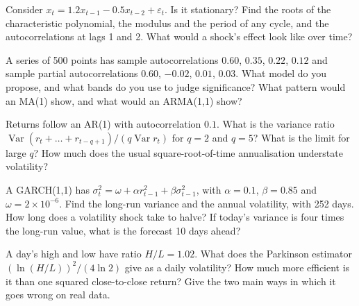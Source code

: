 \begin{question}\label{iq:iv1:time-series:5}
Consider $x_t = 1.2x_{t-1} - 0.5x_{t-2} + \varepsilon_t$. Is it stationary? Find the roots of the characteristic polynomial, the modulus and the period of any cycle, and the autocorrelations at lags 1 and 2. What would a shock's effect look like over time?
\end{question}

\begin{question}\label{iq:iv1:time-series:6}
A series of 500 points has sample autocorrelations $0.60$, $0.35$, $0.22$, $0.12$ and sample partial autocorrelations $0.60$, $-0.02$, $0.01$, $0.03$. What model do you propose, and what bands do you use to judge significance? What pattern would an MA(1) show, and what would an ARMA(1,1) show?
\end{question}

\begin{question}\label{iq:iv1:time-series:7}
Returns follow an AR(1) with autocorrelation $0.1$. What is the variance ratio $\operatorname{Var}(r_t + \dots + r_{t-q+1})/(q\operatorname{Var}r_t)$ for $q = 2$ and $q = 5$? What is the limit for large $q$? How much does the usual square-root-of-time annualisation understate volatility?
\end{question}

\begin{question}\label{iq:iv1:time-series:8}
A GARCH(1,1) has $\sigma_t^2 = \omega + \alpha r_{t-1}^2 + \beta\sigma_{t-1}^2$, with $\alpha = 0.1$, $\beta = 0.85$ and $\omega = 2 \times 10^{-6}$. Find the long-run variance and the annual volatility, with 252 days. How long does a volatility shock take to halve? If today's variance is four times the long-run value, what is the forecast 10 days ahead?
\end{question}

\begin{question}\label{iq:iv1:time-series:9}
A day's high and low have ratio $H/L = 1.02$. What does the Parkinson estimator $(\ln(H/L))^2/(4\ln 2)$ give as a daily volatility? How much more efficient is it than one squared close-to-close return? Give the two main ways in which it goes wrong on real data.
\end{question}

